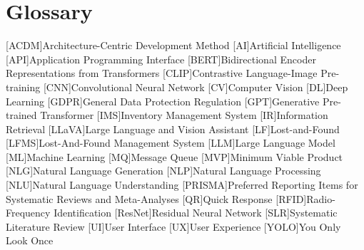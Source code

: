 \chapter{Glossary}

\footnotesize
\DoubleSpacing

\begin{multicols}{2}
\begin{acronym}[ai]
	[ACDM]{Architecture-Centric Development Method}
	[AI]{Artificial Intelligence}
	[API]{Application Programming Interface}
	[BERT]{Bidirectional Encoder Representations from Transformers}
	[CLIP]{Contrastive Language-Image Pre-training}
	[CNN]{Convolutional Neural Network}
	[CV]{Computer Vision}
	[DL]{Deep Learning}
	[GDPR]{General Data Protection Regulation}
	[GPT]{Generative Pre-trained Transformer}
	[IMS]{Inventory Management System}
	[IR]{Information Retrieval}
	[LLaVA]{Large Language and Vision Assistant}
	[LF]{Lost-and-Found}
	[LFMS]{Lost-And-Found Management System}
	[LLM]{Large Language Model}
	[ML]{Machine Learning}
	[MQ]{Message Queue}
	[MVP]{Minimum Viable Product}
	[NLG]{Natural Language Generation}
	[NLP]{Natural Language Processing}
	[NLU]{Natural Language Understanding}
	[PRISMA]{Preferred Reporting Items for Systematic Reviews and Meta-Analyses}
	[QR]{Quick Response}
	[RFID]{Radio-Frequency Identification}
	[ResNet]{Residual Neural Network}
	[SLR]{Systematic Literature Review}
	[UI]{User Interface}
	[UX]{User Experience}
	[YOLO]{You Only Look Once}
\end{acronym}
\end{multicols}

